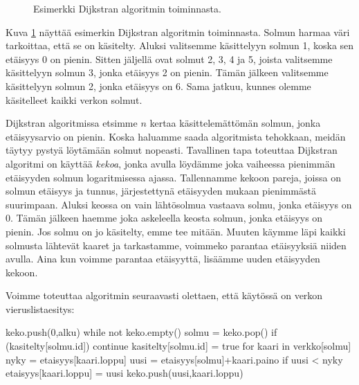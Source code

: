 \begin{figure}
\begin{center}
\end{center}
\caption{Esimerkki Dijkstran algoritmin toiminnasta.}
\label{fig:dijalg}
\end{figure}

Kuva \ref{fig:dijalg} näyttää esimerkin Dijkstran algoritmin
toiminnasta.
Solmun harmaa väri tarkoittaa, että se on käsitelty.
Aluksi valitsemme käsittelyyn solmun 1, koska sen etäisyys 0 on pienin.
Sitten jäljellä ovat solmut 2, 3, 4 ja 5,
joista valitsemme käsittelyyn solmun 3, jonka etäisyys 2 on pienin.
Tämän jälkeen valitsemme käsittelyyn solmun 2,
jonka etäisyys on 6.
Sama jatkuu, kunnes olemme käsitelleet kaikki verkon solmut.

Dijkstran algoritmissa etsimme $n$ kertaa
käsittelemättömän solmun, jonka etäisyysarvio on pienin.
Koska haluamme saada algoritmista tehokkaan,
meidän täytyy pystyä löytämään solmut nopeasti.
Tavallinen tapa toteuttaa Dijkstran algoritmi on käyttää \emph{kekoa},
jonka avulla löydämme joka vaiheessa pienimmän etäisyyden solmun
logaritmisessa ajassa.
Tallennamme kekoon pareja, joissa on solmun etäisyys ja tunnus,
järjestettynä etäisyyden mukaan pienimmästä suurimpaan.
Aluksi keossa on vain lähtösolmua vastaava solmu,
jonka etäisyys on $0$.
Tämän jälkeen haemme joka askeleella keosta solmun,
jonka etäisyys on pienin.
Jos solmu on jo käsitelty, emme tee mitään.
Muuten käymme läpi kaikki solmusta lähtevät kaaret
ja tarkastamme, voimmeko parantaa etäisyyksiä
niiden avulla.
Aina kun voimme parantaa etäisyyttä,
lisäämme uuden etäisyyden kekoon.

Voimme toteuttaa algoritmin seuraavasti olettaen,
että käytössä on verkon vieruslistaesitys:

\begin{code}
keko.push({0,alku})
while not keko.empty()
    solmu = keko.pop()
    if (kasitelty[solmu.id])
        continue
    kasitelty[solmu.id] = true
    for kaari in verkko[solmu]
        nyky = etaisyys[kaari.loppu]
        uusi = etaisyys[solmu]+kaari.paino
        if uusi < nyky
            etaisyys[kaari.loppu] = uusi
            keko.push({uusi,kaari.loppu})
\end{code}

